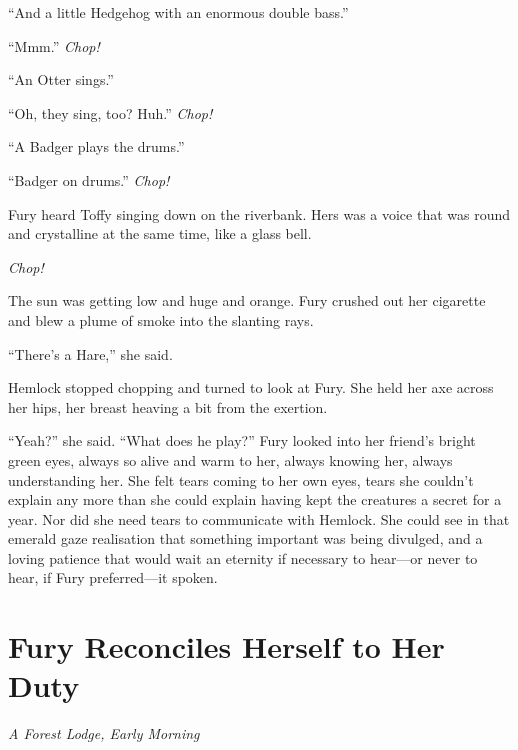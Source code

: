 \documentclass[11pt,a5paper]{article}
\newcommand{\alet}[1]{\textit{#1}\vspace{1em}}
\begin{document}
``And a little Hedgehog with an enormous double bass.''

``Mmm.'' \emph{Chop!}

``An Otter sings.''

``Oh, they sing, too? Huh.'' \emph{Chop!}

``A Badger plays the drums.''

``Badger on drums.'' \emph{Chop!}

Fury heard Toffy singing down on the riverbank. Hers was a voice that was round and crystalline at the same time, like a glass bell.

\emph{Chop!}

The sun was getting low and huge and orange. Fury crushed out her cigarette and blew a plume of smoke into the slanting rays.

``There's a Hare,'' she said.

Hemlock stopped chopping and turned to look at Fury. She held her axe across her hips, her breast heaving a bit from the exertion.

``Yeah?'' she said. ``What does he play?'' Fury looked into her friend's bright green eyes, always so alive and warm to her, always knowing her, always understanding her. She felt tears coming to her own eyes, tears she couldn't explain any more than she could explain having kept the creatures a secret for a year. Nor did she need tears to communicate with Hemlock. She could see in that emerald gaze realisation that something important was being divulged, and a loving patience that would wait an eternity if necessary to hear---or never to hear, if Fury preferred---it spoken.

\newpage

\section{Fury Reconciles Herself to Her Duty}

\alet{A Forest Lodge, Early Morning}
\end{document}
